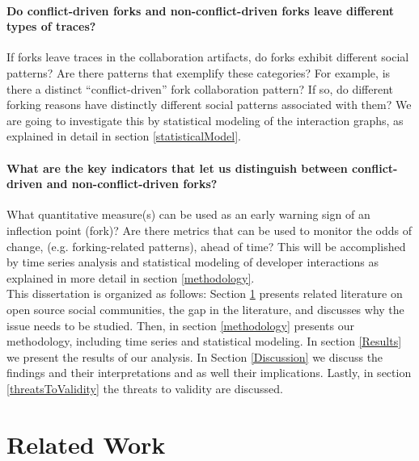 \documentclass[12pt]{report}
\begin{document}
\paragraph*{\hspace{4 mm} Do conflict-driven forks and non-conflict-driven forks leave different types of traces?\\}

If forks leave traces in the collaboration artifacts, do forks exhibit different social patterns? Are there patterns that exemplify these categories? For example, is there a distinct ``conflict-driven'' fork collaboration pattern? If so, do different forking reasons have distinctly different social patterns associated with them? We are going to investigate this by statistical modeling of the interaction graphs, as explained in detail in section \ref{statisticalModel}.

\paragraph*{\hspace{4 mm} What are the key indicators that let us distinguish between conflict-driven and non-conflict-driven forks?\\}

What quantitative measure(s) can be used as an early warning sign of an inflection point (fork)? Are there metrics that can be used to monitor the odds of change, (e.g. forking-related patterns), ahead of time? This will be accomplished by time series analysis and statistical modeling of developer interactions as explained in more detail in section \ref{methodology}.\\

This dissertation is organized as follows: Section \ref{relatedwork} presents related literature on open source social communities, the gap in the literature, and discusses why the issue needs to be studied. Then, in section \ref{methodology} presents our methodology, including time series and statistical modeling. In section \ref{Results} we present the results of our analysis. In Section \ref{Discussion} we discuss the findings and their interpretations and as well their implications. Lastly, in section \ref{threatsToValidity} the threats to validity are discussed.

\section{Related Work}
\label{relatedwork}
\end{document}
